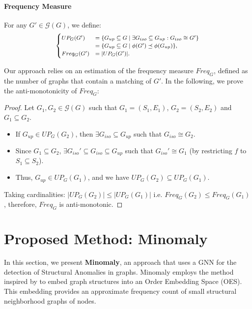 \documentclass[pdflatex,sn-mathphys-num]{sn-jnl}%
\theoremstyle{thmstyleone}%
\theoremstyle{thmstyletwo}%
\theoremstyle{thmstylethree}%
\begin{document}
\paragraph{Frequency Measure}
For any $G' \in \mathcal{G}(G)$, we define:
\[ \footnotesize
\begin{cases}
    UP_G(G') &= \{G_{up} \subseteq G \mid \exists G_{iso} \subseteq G_{up}: G_{iso} \cong G'\} \\ &= \{G_{up} \subseteq G \mid \phi(G') \preceq \phi(G_{up})\}, \\
    Freq_G(G') &= |UP_G(G')|.
\end{cases}
\]

Our approach relies on an estimation of the frequency measure \( Freq_G \), defined as the number of graphs that contain a matching of \( G' \). In the following, we prove the anti-monotonicity of $Freq_G$:

\begin{proof}
Let $G_1, G_2 \in \mathcal{G}(G)$ such that $G_1=(S_1, E_1)$, $G_2=(S_2, E_2)$ and $G_1 \subseteq G_2$.  
\begin{itemize}
    \item If $G_{up} \in UP_G(G_2)$, then $\exists G_{iso} \subseteq G_{up}$ such that $G_{iso} \cong G_2$. 
    \item Since $G_1 \subseteq G_2$, $\exists G_{iso}' \subseteq G_{iso} \subseteq G_{up}$ such that $G_{iso}' \cong G_1$ (by restricting $f$ to $S_1 \subseteq S_2$). 
    \item Thus, $G_{up} \in UP_G(G_1)$, and we have $UP_G(G_2) \subseteq UP_G(G_1)$. 
\end{itemize}
Taking cardinalities: $|UP_G(G_2)| \leq |UP_G(G_1)|$ i.e. $Freq_G(G_2) \leq Freq_G(G_1)$, therefore, $Freq_G$ is anti-monotonic.
\end{proof}



\section{Proposed Method: Minomaly}
\label{sec:proposal}

In this section, we present \textbf{Minomaly}, an approach that uses a GNN for the detection of Structural Anomalies in graphs. Minomaly employs the  method \cite{rex2020neural} inspired by \cite{vendrov2016orderembeddings} to embed graph structures into an Order Embedding Space (OES). This embedding provides an approximate frequency count of small structural neighborhood graphs of nodes.
\end{document}
